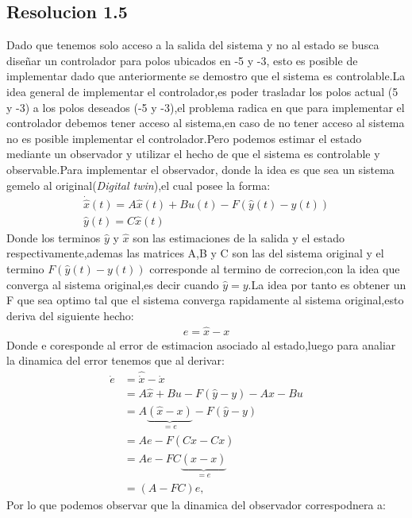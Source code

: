 \documentclass[
  11pt,
  letterpaper,
   addpoints,
  answers
  ]{exam}
\begin{document}
\begin{questions}
\begin{solution}
    \subsection*{Resolucion 1.5}
    Dado que tenemos solo acceso a la salida del sistema y no al estado se busca diseñar un controlador para polos ubicados en -5 y -3, esto es posible de implementar dado que anteriormente se demostro que el sistema es controlable.La idea general de implementar el controlador,es poder trasladar los polos actual (5 y -3) a los polos deseados (-5 y -3),el problema radica en que para implementar el controlador debemos tener acceso al sistema,en caso de no tener acceso al sistema no es posible implementar el controlador.Pero podemos estimar el estado mediante un observador y utilizar el hecho de que el sistema es controlable y observable.Para implementar el observador, donde la idea es que sea un sistema gemelo al original(\textit{Digital twin}),el cual posee la forma:
    \begin{align}
        \dot{\hat{x}}(t) = A\hat{x}(t) + Bu(t) - F(\hat{y}(t)-y(t))\\
        \hat{y}(t) = C\hat{x}(t)
    \end{align}
    Donde los terminos $\hat{y}$ y $\hat{x}$ son las estimaciones de la salida y el estado respectivamente,ademas las matrices A,B y C son las del sistema original y el termino $F(\hat{y}(t)-y(t))$ corresponde al termino de correcion,con la idea que converga al sistema original,es decir cuando $\hat{y}=y$.La idea por tanto es obtener un F que sea optimo tal que el sistema converga rapidamente al sistema original,esto deriva del siguiente hecho:
    \begin{align}
        e=\hat{x}-x
    \end{align}
    Donde e coresponde al error de estimacion asociado al estado,luego para analiar la dinamica del error tenemos que al derivar:
    \begin{align}
        \dot{e} &= \hat{\dot{x}} - \dot{x} \\
                &= A \hat{x} + Bu - F (\hat{y} - y) - A x - Bu \\
                &= A \underbrace{(\hat{x} - x)}_{=e} - F (\hat{y} - y) \\
                &= A e - F \left( C \hat{x} - C x \right) \\
                &= A e - FC \underbrace{(\hat{x} - x)}_{=e} \\
                &= (A - FC) e,
        \end{align}
    Por lo que podemos observar que la dinamica del observador correspodnera a:

\end{solution}
\end{questions}
\end{document}
